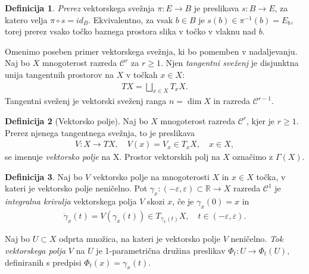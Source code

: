 \documentclass[12pt,a4paper,twoside]{article}
\theoremstyle{definition} %
\newtheorem{definicija}{Definicija}[section]
\theoremstyle{plain} %
\numberwithin{equation}{section}  %
\newcommand{\R}{\mathbb R}
\begin{document}
\begin{definicija}
\emph{Prerez} vektorskega svežnja $\pi \colon E \to B$ je preslikava $s \colon B \to E$, za katero velja $\pi \circ s = id_{B}$.
Ekvivalentno, za vsak $b \in B$ je $s(b) \in \pi^{-1}(b) = E_{b}$, torej prerez vsako točko baznega prostora slika v točko v vlaknu nad $b$.
\end{definicija}

Omenimo poseben primer vektorskega svežnja, ki bo pomemben v nadaljevanju. Naj bo $X$ mnogoterost razreda $\mathcal{C}^{r}$ za $r \geq 1$. Njen \emph{tangentni sveženj} je disjunktna unija tangentnih prostorov na $X$ v točkah $x \in X$:
\begin{gather}
TX = \bigsqcup_{x \in X} T_{x}X.
\end{gather}
Tangentni sveženj je vektorski sveženj ranga $n = \dim X$ in razreda $\mathcal{C}^{r-1}$.

\begin{definicija} [Vektorsko polje]
Naj bo $X$ mnogoterost razreda $\mathcal{C}^{r}$, kjer je $r \geq 1$. Prerez njenega tangentnega svežnja, to je preslikava 
\begin{gather}
V \colon X \to TX, \quad V(x) = V_{x} \in T_{x}X, \quad x \in X,
\end{gather}
se imenuje \emph{vektorsko polje} na X. Prostor vektorskih polj na $X$ označimo z $\Gamma (X)$.
\end{definicija}

\begin{definicija}
Naj bo $V$ vektorsko polje na mnogoterosti $X$ in $x \in X$ točka, v kateri je vektorsko polje neničelno. Pot $\gamma_{x} \colon (-\varepsilon, \varepsilon) \subset \R \to X$ razreda $\mathcal{C}^{1}$ je \emph{integralna krivulja} vektorskega polja $V$ skozi $x$, če je $\gamma_{x}(0) = x$ in
\begin{gather}
\dot{\gamma}_{x} (t) = V(\gamma _{x}(t)) \in T_{\gamma _{x}(t)}X, \quad t \in (-\varepsilon, \varepsilon).
\end{gather}

Naj bo $U \subset X$ odprta množica, na kateri je vektorsko polje $V$ neničelno. \emph{Tok vektorskega polja} $V$ na $U$ je 1-parametrična družina preslikav
$ \Phi_{t} \colon U \to \Phi_{t}(U),$ definiranih s predpisi $\Phi_{t}(x) = \gamma_{x}(t)$.
\end{definicija}
\end{document}
